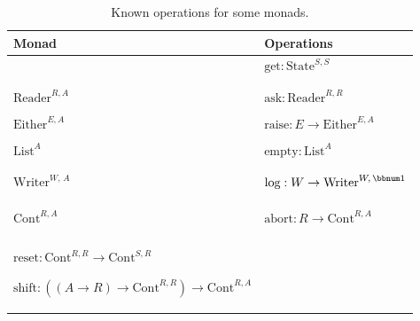 \begin{table}[H]
\begin{centering}
\begin{tabular}{|>{\centering}m{1.6cm}|>{\centering}m{8.5cm}|}
\hline 
\textbf{\small{}Monad} & \textbf{\small{}Operations}\tabularnewline
\hline 
\hline 
{\small{}$\text{State}^{S,A}$} & {\small{}$\text{get}:\text{State}^{S,S}$}\\
{\small{}$\text{set}:S\rightarrow\text{State}^{S,\bbnum 1}$}\\
{\small{}$\text{update}:(S\rightarrow S)\rightarrow\text{State}^{S,\bbnum 1}$}\tabularnewline
\hline 
{\small{}$\text{Reader}^{R,A}$} & {\small{}$\text{ask}:\text{Reader}^{R,R}$}\\
{\small{}$\text{local}:R\times\text{Reader}^{R,A}\rightarrow\text{Reader}^{R,A}$}\tabularnewline
\hline 
{\small{}$\text{Either}^{E,A}$} & {\small{}$\text{raise}:E\rightarrow\text{Either}^{E,A}$}\\
{\small{}$\text{handle}:(E\rightarrow\text{Either}^{E,A})\times\text{Either}^{E,A}\rightarrow\text{Either}^{E,A}$}\tabularnewline
\hline 
{\small{}$\text{List}^{A}$} & {\small{}$\text{empty}:\text{List}^{A}$}\\
{\small{}$\text{append}:\text{List}^{A}\times\text{List}^{A}\rightarrow\text{List}^{A}$}\\
{\small{}$\text{filter}:\text{List}^{A}\times(A\rightarrow\bbnum 2)\rightarrow\text{List}^{A}$}\tabularnewline
\hline 
{\small{}$\text{Writer}^{W,\,A}$} & {\small{}$\text{log}:W\rightarrow\text{Writer}^{W,\,\bbnum 1}$}\\
{\small{}$\text{collect}:\text{Writer}^{W,\,A}\rightarrow\text{Writer}^{W,\,A\times W}$}\\
{\small{}$\text{process}:\text{Writer}^{W,\,A\times(W\rightarrow W)}\rightarrow\text{Writer}^{W,\,A}$}\\
{\small{}$\text{clear}:\text{Writer}^{W,\,A}\rightarrow\text{Writer}^{W,\,A}$}\tabularnewline
\hline 
{\small{}$\text{Cont}^{R,A}$} & {\small{}$\text{abort}:R\rightarrow\text{Cont}^{R,A}$}\\
{\small{}$\text{callcc}:((A\rightarrow\text{Cont}^{R,B})\rightarrow\text{Cont}^{R,A})\rightarrow\text{Cont}^{R,A}$}\\
{\small{}$\text{wrap}:A\rightarrow(R\rightarrow R)\rightarrow\text{Cont}^{R,A}$}{\small\par}

{\small{}$\text{reset}:\text{Cont}^{R,R}\rightarrow\text{Cont}^{S,R}$}{\small\par}

{\small{}$\text{shift}:((A\rightarrow R)\rightarrow\text{Cont}^{R,R})\rightarrow\text{Cont}^{R,A}$}\tabularnewline
\hline 
\end{tabular}
\par\end{centering}
\caption{Known operations for some monads.\label{tab:effectful-operations-for-some-monads}}

\end{table}

